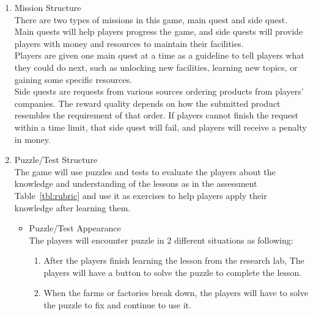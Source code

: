 \documentclass[12pt,oneside,openright,a4paper]{cpe-english-project}
\begin{document}
\begin{itemize}
\begin{enumerate}
	\item Mission Structure \\
	There are two types of missions in this game, main quest and side quest. Main quests will help players progress the game, and side quests will provide players with money and resources to maintain their facilities. \\
	Players are given one main quest at a time as a guideline to tell players what they could do next, such as unlocking new facilities, learning new topics, or gaining some specific resources. \\
	Side quests are requests from various sources ordering products from players' companies. The reward quality depends on how the submitted product resembles the requirement of that order. If players cannot finish the request within a time limit, that side quest will fail, and players will receive a penalty in money.

	\item Puzzle/Test Structure \\
	The game will use puzzles and tests to evaluate the players about the knowledge and understanding of the lessons as in the assessment Table~\ref{tbl:rubric} and use it as exercises to help players apply their knowledge after learning them.
	\begin{itemize}
		
		\item Puzzle/Test Appearance \\
		The players will encounter puzzle in 2 different situations as following:
		\begin{enumerate}
			\item After the players finish learning the lesson from the research lab, The players will have a button to solve the puzzle to complete the lesson.
			\item When the farms or factories break down, the players will have to solve the puzzle to fix and continue to use it.
		\end{enumerate}
		

\end{itemize}
\end{enumerate}
\end{itemize}
\end{document}
